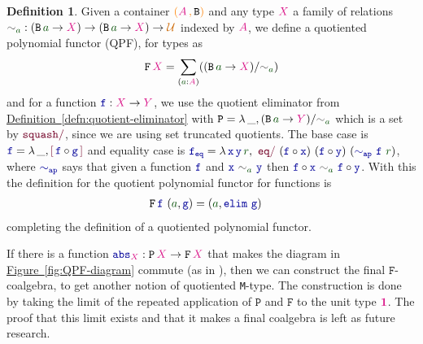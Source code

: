 \documentclass[twoside,11pt,openright]{report}
\theoremstyle{plain} %
\theoremstyle{definition}
\newtheorem{defn}[thm]{Definition}%
\theoremstyle{remark}
\newcommand*{\defref}[1]{\hyperref[defn:#1]{Definition~\ref*{defn:#1}}}
\newcommand*{\figref}[1]{\hyperref[fig:#1]{Figure~\ref*{fig:#1}}}
\newcommand*{\term}[1]{\textcolor{green!30!black}{#1}} %
\newcommand*{\type}[1]{\textcolor{magenta!90!black}{#1}}
\newcommand*{\containerpair}[2]{\ensuremath{\colorlet{savedleftcolor}{.}\color{orange}\left(\color{savedleftcolor}#1\,\textcolor{orange}{\mathbf{,}}\,#2\color{orange}\right)\color{savedleftcolor}}}
\newcommand*{\universe}[1]{\textcolor{orange!80!black}{#1}}
\newcommand*{\unit}{\type{\textbf{1}}}
\newcommand*{\relation}[1]{\textcolor{gray!75!black}{\ensuremath{\mathtt{#1}}}}
\newcommand*{\function}[1]{\textcolor{blue!60!black}{\ensuremath{\mathtt{#1}}}}
\newcommand*{\constructor}[1]{\textcolor{purple!60!black}{\ensuremath{\mathtt{#1}}}}
\newcommand*{\typeformer}[1]{\ensuremath{\mathtt{#1}}}
\newcommand*{\functor}[1]{\ensuremath{\mathbf{\mathtt{#1}}}}
\newcommand*{\quotientconstructor}[1]{\constructor{[}\,#1\,\constructor{]}}
\begin{document}
\begin{defn}
  Given a container \(\containerpair{\type{A}}{\typeformer{B}}\) and any type \(\type{X}\) a family of relations \(\relation{\sim}_{\term{a}} : (\typeformer{B}\,\term{a} \rightarrow \type{X}) \rightarrow (\typeformer{B}\,\term{a} \rightarrow \type{X}) \rightarrow \universe{\mathcal{U}}\) indexed by \(\type{A}\), we define a quotiented polynomial functor (QPF), for types as
  \begin{equation}
    \functor{F}\,\type{X} =  \sum_{(\term{a} : \type{A})} ((\typeformer{B}\,\term{a} \rightarrow \type{X}) / \relation{\sim}_{\term{a}})
  \end{equation}
  and for a function \(\function{f} : \type{X} \rightarrow \type{Y}\), we use the quotient eliminator from \defref{quotient-eliminator} with \(\typeformer{P} = \lambda\,\_, (\typeformer{B}\,\term{a} \rightarrow \type{Y})/\relation{\sim}_{\term{a}}\) which is a set by \(\constructor{squash/}\), since we are using set truncated quotients. The base case is \(\function{f} = \lambda\,\_,\quotientconstructor{\function{f} \circ \function{g}}\) and equality case is \(\function{f_{eq}} = \lambda\,\function{x}\,\function{y}\,\term{r},~\constructor{eq/}~(\function{f} \circ \function{x})~(\function{f} \circ \function{y})~(\function{\sim_{ap}}~\function{f}~\term{r})\), where \(\function{\sim_{ap}}\) says that given a function \(\function{f}\) and \(\function{x}~\relation{\sim}_{\term{a}}~\function{y}\) then \(\function{f} \circ \function{x}~\relation{\sim}_{\term{a}}~\function{f} \circ \function{y}\). With this the definition for the quotient polynomial functor for functions is
  \begin{equation}
    \begin{aligned}
      &\functor{F}\,\function{f}~(\term{a} , \function{g}) = (\term{a} , \function{elim}~\function{g})
    \end{aligned} 
  \end{equation}
  completing the definition of a quotiented polynomial functor.
\end{defn}
\noindent If there is a function \(\function{abs}_{\type{X}} : \functor{P}\,\type{X} \rightarrow \functor{F}\,\type{X}\) that makes the diagram in \figref{QPF-diagram} commute (as in \cite{DBLP:QM-lean}), then we can construct the final \(\functor{F}\)-coalgebra, to get another notion of quotiented \texttt{M}-type. The construction is done by taking the limit of the repeated application of \(\functor{P}\) and \(\functor{F}\) to the unit type \(\unit\). The proof that this limit exists and that it makes a final coalgebra is left as future research.
\end{document}
